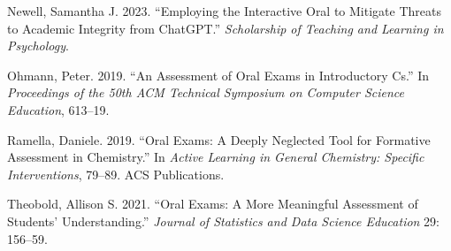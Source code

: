 \documentclass[
  letterpaper,
  DIV=11,
  numbers=noendperiod]{scrartcl}
\newlength{\cslhangindent}
\newlength{\cslentryspacingunit} %
\newenvironment{CSLReferences}[2] %
 {%
  \setlength{\parindent}{0pt}
  \ifodd #1
  \let\oldpar\par
  \def\par{\hangindent=\cslhangindent\oldpar}
  \fi
  \setlength{\parskip}{#2\cslentryspacingunit}
 }%
 {}
\begin{document}
\begin{CSLReferences}{1}{0}
\leavevmode{}%
Newell, Samantha J. 2023. {``Employing the Interactive Oral to Mitigate
Threats to Academic Integrity from ChatGPT.''} \emph{Scholarship of
Teaching and Learning in Psychology}.

\leavevmode{}%
Ohmann, Peter. 2019. {``An Assessment of Oral Exams in Introductory
Cs.''} In \emph{Proceedings of the 50th ACM Technical Symposium on
Computer Science Education}, 613--19.

\leavevmode{}%
Ramella, Daniele. 2019. {``Oral Exams: A Deeply Neglected Tool for
Formative Assessment in Chemistry.''} In \emph{Active Learning in
General Chemistry: Specific Interventions}, 79--89. ACS Publications.

\leavevmode{}%
Theobold, Allison S. 2021. {``Oral Exams: A More Meaningful Assessment
of Students' Understanding.''} \emph{Journal of Statistics and Data
Science Education} 29: 156--59.

\end{CSLReferences}
\end{document}

